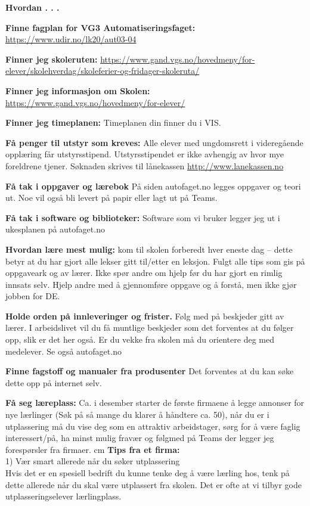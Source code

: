 

\centerline{\bf Hvordan . . .} \bigskip 

\noindent
{\bf Finne fagplan for VG3 Automatiseringsfaget:} \url{https://www.udir.no/lk20/aut03-04}
\vskip 10pt

\noindent
{\bf Finner jeg skoleruten:} \url{https://www.gand.vgs.no/hovedmeny/for-elever/skolehverdag/skoleferier-og-fridager-skoleruta/}
\vskip 10pt

\noindent
{\bf Finner jeg informasjon om Skolen:} \url{https://www.gand.vgs.no/hovedmeny/for-elever/}
\vskip 10pt

\noindent
{\bf Finner jeg timeplanen:} Timeplanen din finner du i VIS. 
\vskip 10pt

\noindent
{\bf Få penger til utstyr som kreves:} Alle elever med ungdomsrett i videregående opplæring får utstyrsstipend. Utstyrsstipendet er ikke avhengig av hvor mye foreldrene tjener.
Søknaden skrives til lånekassen \url{http://www.lanekassen.no}
\vskip 10pt

\noindent
{\bf Få tak i oppgaver og lærebok} På siden autofaget.no legges oppgaver og teori ut. Noe vil også bli levert på papir eller lagt ut på Teams. 
\vskip 10pt

\noindent
{\bf Få tak i  software og biblioteker:} Software som vi bruker legger jeg ut i ukesplanen på autofaget.no  
\vskip 10pt

\noindent
{\bf Hvordan lære mest mulig:} kom til skolen forberedt hver eneste dag -- dette betyr at du har gjort alle lekser gitt til/etter en leksjon. Fulgt alle tips som gis på oppgaveark og av lærer. Ikke spør andre om hjelp før du har gjort en rimlig innsats selv. Hjelp andre med å gjennomføre oppgave og å forstå, men ikke gjør jobben for DE. 
\vskip 10pt

\noindent
{\bf Holde orden på innleveringer og frister.} Følg med på beskjeder gitt av lærer. I arbeidslivet vil du få muntlige beskjeder som det forventes at du følger opp, slik er det her også. Er du vekke fra skolen må du orientere deg med medelever. Se også autofaget.no
\vskip 10pt


\noindent
{\bf Finne fagstoff og manualer fra produsenter } Det forventes at du kan søke dette opp på internet selv. 
\vskip 10pt



\noindent
{\bf Få seg læreplass:} Ca. i desember starter de første firmaene å legge annonser for nye lærlinger (Søk på så mange du klarer å håndtere ca. 50), når du er i utplassering må du vise deg som en attraktiv arbeidstager, sørg for å være faglig interessert/på, ha minst mulig fravær og følgmed på Teams der legger jeg forespørsler fra firmaer. 
 cm
{\bf Tips fra et firma:}\\ 
1) Vær smart allerede når du søker utplassering\\
Hvis det er en spesiell bedrift du kunne tenke deg å være lærling hos, tenk på dette allerede når du skal være utplassert fra skolen. Det er ofte at vi tilbyr gode utplasseringselever lærlingplass.

